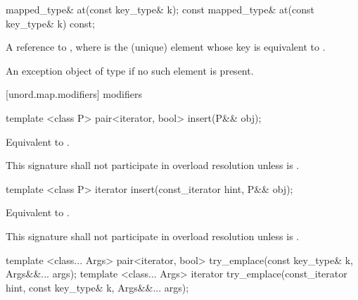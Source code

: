 %
%
%
\begin{itemdecl}
mapped_type& at(const key_type& k);
const mapped_type& at(const key_type& k) const;
\end{itemdecl}

\begin{itemdescr}
\pnum
\returns A reference to , where  is the (unique) element whose key is equivalent to .

\pnum
\throws An exception object of type  if no such element is present.
\end{itemdescr}

[unord.map.modifiers]{ modifiers}

%
%
\begin{itemdecl}
template <class P>
  pair<iterator, bool> insert(P&& obj);
\end{itemdecl}

\begin{itemdescr}
\pnum
\effects Equivalent to . 

\pnum
\remarks This signature shall not participate in overload resolution
unless  is .
\end{itemdescr}

%
%
\begin{itemdecl}
template <class P>
  iterator insert(const_iterator hint, P&& obj);
\end{itemdecl}

\begin{itemdescr}
\pnum
\effects Equivalent to 
.

\pnum
\remarks This signature shall not participate in overload resolution
unless  is .
\end{itemdescr}

%
%
\begin{itemdecl}
template <class... Args> pair<iterator, bool> try_emplace(const key_type& k, Args&&... args);
template <class... Args> iterator try_emplace(const_iterator hint, const key_type& k, Args&&... args);
\end{itemdecl}

